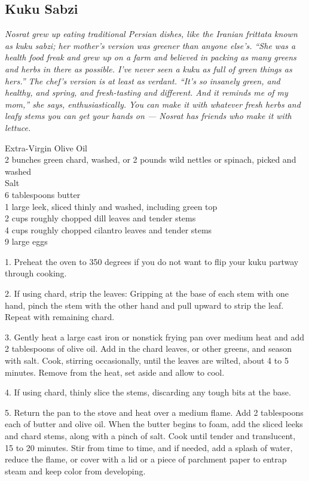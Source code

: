 \hypertarget{kuku-sabzi}{%
\subsection{Kuku Sabzi}\label{kuku-sabzi}}

\emph{Nosrat grew up eating traditional Persian dishes, like the Iranian
frittata known as kuku sabzi; her mother's version was greener than
anyone else's. ``She was a health food freak and grew up on a farm and
believed in packing as many greens and herbs in there as possible. I've
never seen a kuku as full of green things as hers.'' The chef's version
is at least as verdant. ``It's so insanely green, and healthy, and
spring, and fresh-tasting and different. And it reminds me of my mom,''
she says, enthusiastically. You can make it with whatever fresh herbs
and leafy stems you can get your hands on --- Nosrat has friends who
make it with lettuce.}

Extra-Virgin Olive Oil\\
2 bunches green chard, washed, or 2 pounds wild nettles or spinach,
picked and washed\\
Salt\\
6 tablespoons butter\\
1 large leek, sliced thinly and washed, including green top\\
2 cups roughly chopped dill leaves and tender stems\\
4 cups roughly chopped cilantro leaves and tender stems\\
9 large eggs

1. Preheat the oven to 350 degrees if you do not want to flip your kuku
partway through cooking.

2. If using chard, strip the leaves: Gripping at the base of each stem
with one hand, pinch the stem with the other hand and pull upward to
strip the leaf. Repeat with remaining chard.

3. Gently heat a large cast iron or nonstick frying pan over medium heat
and add 2 tablespoons of olive oil. Add in the chard leaves, or other
greens, and season with salt. Cook, stirring occasionally, until the
leaves are wilted, about 4 to 5 minutes. Remove from the heat, set aside
and allow to cool.

4. If using chard, thinly slice the stems, discarding any tough bits at
the base.

5. Return the pan to the stove and heat over a medium flame. Add 2
tablespoons each of butter and olive oil. When the butter begins to
foam, add the sliced leeks and chard stems, along with a pinch of salt.
Cook until tender and translucent, 15 to 20 minutes. Stir from time to
time, and if needed, add a splash of water, reduce the flame, or cover
with a lid or a piece of parchment paper to entrap steam and keep color
from developing.

